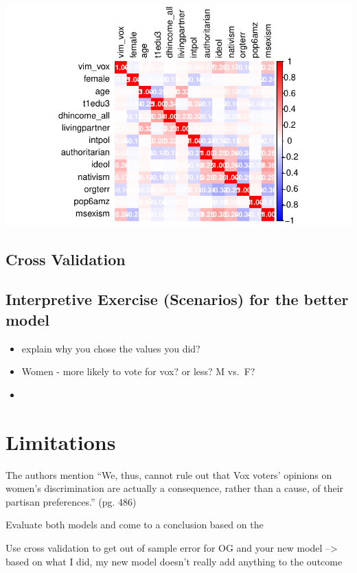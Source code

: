 \documentclass[
  letterpaper,
  DIV=11,
  numbers=noendperiod]{scrartcl}
\begin{document}
\includegraphics{reprod_sexism_files/figure-pdf/unnamed-chunk-10-1.pdf}

\subsection{Cross Validation}\label{cross-validation-1}

\subsection{Interpretive Exercise (Scenarios) for the better
model}\label{interpretive-exercise-scenarios-for-the-better-model}

\begin{itemize}
\item
  explain why you chose the values you did?
\item
  Women - more likely to vote for vox? or less? M vs.~F?
\item
\end{itemize}

\section{Limitations}\label{limitations}

The authors mention ``We, thus, cannot rule out that Vox voters'
opinions on women's discrimination are actually a consequence, rather
than a cause, of their partisan preferences.'' (pg. 486)

Evaluate both models and come to a conclusion based on the

Use cross validation to get out of sample error for OG and your new
model --\textgreater{} based on what I did, my new model doesn't really
add anything to the outcome
\end{document}
